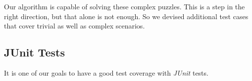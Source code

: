 Our algorithm is capable of solving these complex puzzles. This is a step in the right direction, but that alone is not enough. So we devised additional test cases that cover trivial as well as complex scenarios.

\subsection{JUnit Tests}
It is one of our goals to have a good test coverage with \emph{JUnit} tests.

